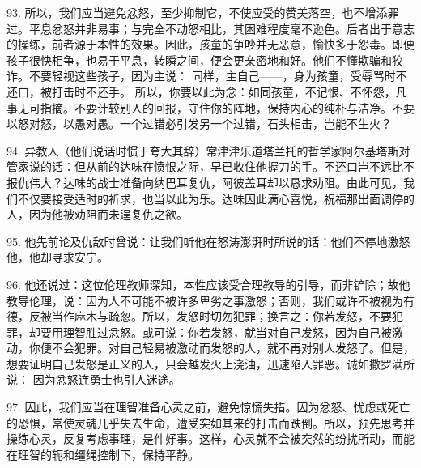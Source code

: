93. 所以，我们应当避免忿怒，至少抑制它，不使应受的赞美落空，也不增添罪过。平息忿怒并非易事；与完全不动怒相比，其困难程度毫不逊色。后者出于意志的操练，前者源于本性的效果。因此，孩童的争吵并无恶意，愉快多于怨毒。即便孩子很快相争，也易于平息，转瞬之间，便会更亲密地和好。他们不懂欺骗和狡诈。不要轻视这些孩子，因为主说： 同样，主自己——，身为孩童，受辱骂时不还口，被打击时不还手。 所以，你要以此为念：如同孩童，不记恨、不怀怨，凡事无可指摘。不要计较别人的回报，守住你的阵地，保持内心的纯朴与洁净。不要以怒对怒，以愚对愚。一个过错必引发另一个过错，石头相击，岂能不生火？\par

94. 异教人（他们说话时惯于夸大其辞）常津津乐道塔兰托的哲学家阿尔基塔斯对管家说的话：但从前的达味在愤恨之际，早已收住他握刀的手。不还口岂不远比不报仇伟大？达味的战士准备向纳巴耳复仇，阿彼盖耳却以恳求劝阻。由此可见，我们不仅要接受适时的祈求，也当以此为乐。达味因此满心喜悦，祝福那出面调停的人，因为他被劝阻而未逞复仇之欲。\par

95. 他先前论及仇敌时曾说：让我们听他在怒涛澎湃时所说的话：他们不停地激怒他，他却寻求安宁。\par

96. 他还说过：这位伦理教师深知，本性应该受合理教导的引导，而非铲除；故他教导伦理，说：因为人不可能不被许多卑劣之事激怒；否则，我们或许不被视为有德，反被当作麻木与疏忽。所以，发怒时切勿犯罪；换言之：你若发怒，不要犯罪，却要用理智胜过忿怒。或可说：你若发怒，就当对自己发怒，因为自己被激动，你便不会犯罪。对自己轻易被激动而发怒的人，就不再对别人发怒了。但是，想要证明自己发怒是正义的人，只会越发火上浇油，迅速陷入罪恶。诚如撒罗满所说： 因为忿怒连勇士也引人迷途。\par

97. 因此，我们应当在理智准备心灵之前，避免惊慌失措。因为忿怒、忧虑或死亡的恐惧，常使灵魂几乎失去生命，遭受突如其来的打击而跌倒。所以，预先思考并操练心灵，反复考虑事理，是件好事。这样，心灵就不会被突然的纷扰所动，而能在理智的轭和缰绳控制下，保持平静。\par


